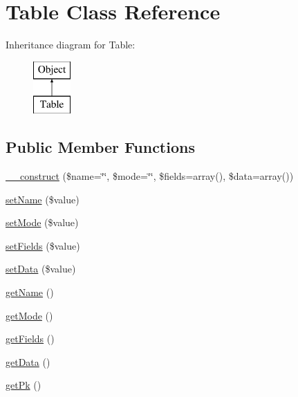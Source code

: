 \hypertarget{classTable}{\section{Table Class Reference}
\label{classTable}
}
Inheritance diagram for Table\-:\begin{figure}[H]
\begin{center}
\leavevmode
\includegraphics[height=2.000000cm]{classTable}
\end{center}
\end{figure}
\subsection*{Public Member Functions}
\begin{DoxyCompactItemize}
\item 
\hyperlink{classTable_a91623aa64ea7f31f72f467185e512aa4}{\-\_\-\-\_\-construct} (\$name=\char`\"{}\char`\"{}, \$mode=\char`\"{}\char`\"{}, \$fields=array(), \$data=array())
\item 
\hyperlink{classTable_aa0f8f35754d7d53c2583f9b06b657fa7}{set\-Name} (\$value)
\item 
\hyperlink{classTable_a26ab532f91acbfa70a0426683474beec}{set\-Mode} (\$value)
\item 
\hyperlink{classTable_afe848d39f27946d4ea1dc660efe356db}{set\-Fields} (\$value)
\item 
\hyperlink{classTable_a1ea0598b1e9ac7dff5374a9b71eff57b}{set\-Data} (\$value)
\item 
\hyperlink{classTable_a8e2ad8a066449c8fedf8f3a9192db355}{get\-Name} ()
\item 
\hyperlink{classTable_a1258d8bb455db47e49ea963f9b7f5166}{get\-Mode} ()
\item 
\hyperlink{classTable_a838132901978900cdf8c6399fd13f219}{get\-Fields} ()
\item 
\hyperlink{classTable_ad04390b230c6a2a911d0812779a7e698}{get\-Data} ()
\item 
\hyperlink{classTable_af1378aceb18290d444c34e3e75150235}{get\-Pk} ()
\end{DoxyCompactItemize}
